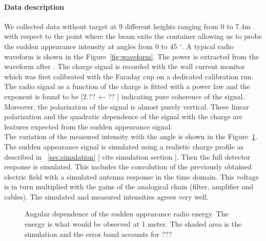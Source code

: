 \documentclass[12pt]{article}
\begin{document}
\paragraph{Data description}
We collected data without target at 9 different heights ranging from 0 to 7.4m with respect to the point where the beam exits the container allowing us to probe the sudden appearance intensity at angles from 0 to 45 $^{\circ}$. A typical radio waveform is shown in the Figure~\ref{fig:waveform}. The power is extracted from the waveform after . The charge signal is recorded with the wall current monitor which was first calibrated with the Faraday cup on a dedicated calibration run. The radio signal as a function of the charge is fitted with a power law and the exponent is found to be \color{red} [2.?? +- ?? ]\color{black} indicating pure coherence of the signal. Moreover, the polarization of the signal is almost purely vertical. These linear polarization and the quadratic dependence of the signal with the charge are features expected from the sudden appearance signal. \\ The variation of the measured intensity with the angle is shown in the Figure~\ref{fig:angdist}. The sudden appearance signal is simulated using a realistic charge profile as described in ~\ref{sec:simulation}\color{red} [ cite simulation section ]\color{black}. Then the full detector response is simulated. This includes the convolution of the previously obtained electric field  with a simulated antenna response in the time domain. This voltage is in turn multiplied with the gains of the analogical chain (filter, amplifier and cables). The simulated and measured intensities agrees very well.

\begin{figure}[!h]
  \centering
  \hspace*{-3ex}
  		        \caption{Angular dependence of the sudden appearance radio energy. The energy is what would be observed at 1 meter. The shaded area is the simulation and the error band accounts for \color{red} ??? \color{black}}
  \label{fig:angdist}
\end{figure}
\end{document}
